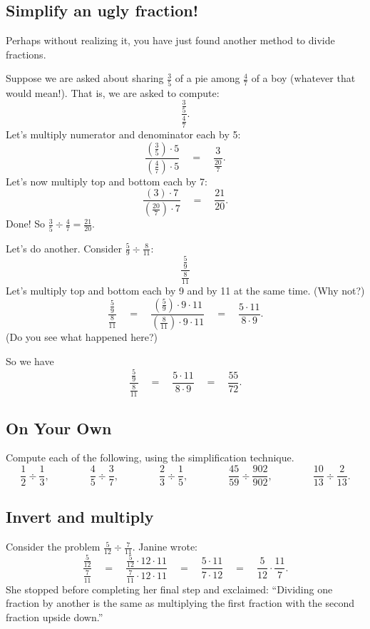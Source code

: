 \subsection{Simplify an ugly fraction!}
Perhaps without realizing it, you have just found another method to divide fractions.

\begin{example}
Suppose we are  asked about sharing $\frac 3 5$
of a pie among $\frac 4 7$
of a boy (whatever that would mean!). That is,
we are  asked to compute:
\[
\frac{\frac 3 5}{\frac 4 7}.
\]
Let's multiply numerator and denominator each by 5:
\[
\frac{\left(\frac 3 5\right)\cdot5}{\left(\frac 4 7\right)\cdot 5}
\quad
=
\quad
\frac{3}{\frac{20}7}.
\]
Let's now multiply top and bottom each by 7:
\[
\frac{\left(3\right)\cdot 7}{\left(\frac{20}7\right)\cdot 7}
\quad
= 
\quad
\frac{21}{20}.
\]
Done!  So $\frac 3 5 \div \frac 4 7 = \frac {21}{20}$.
\end{example}


\begin{example}
Let's do another. Consider $\frac 5 9 \div \frac 8{11}$:
\[
\frac{\frac 59}{\frac 8{11}}
\]
Let's multiply top and bottom each by 9 and by 11 at the same time. (Why not?)
\[
\frac{\frac 59}{\frac 8{11}}
\quad
 =
 \quad
\frac{\left(\frac 59\right)\cdot9\cdot 11}{\left(\frac 8{11}\right) \cdot 9\cdot 11}
\quad
= 
\quad
\frac{5\cdot 11}{8\cdot 9}.
\]
(Do you see what happened here?)

So we have 
\[
\frac{\frac 59}{\frac 8{11}}
\quad
=
\quad
\frac{5\cdot 11}{8\cdot9}
\quad
 = 
 \quad
 \frac {55}{72}.
\]
\end{example}



\subsection*{On Your Own}
Compute each of the following, using the simplification technique.
\[
\frac 12 \div \frac 1 3,
\qquad\qquad
\frac 4 5 \div \frac 3 7,
\qquad\qquad
\frac 2 3 \div \frac 1 5,
\qquad\qquad
\frac {45}{59} \div \frac {902}{902},
\qquad\qquad
\frac{10}{13} \div \frac{2}{13}.
\]



\subsection{Invert and multiply}
Consider the problem
$\frac 5 {12} \div \frac 7 {11}$.
Janine wrote:
\[
\frac{\frac 5 {12} }{ \frac 7 {11}} 
\quad
= 
\quad
\frac{\frac 5 {12} \cdot 12\cdot 11}{ \frac 7 {11} \cdot 12 \cdot 11} 
\quad
= 
\quad
\frac{ 5 \cdot 11 }{  7\cdot 12} 
\quad
=
\quad
\frac 5{12} \cdot \frac{11} 7.
\]
She stopped before completing her final step and  exclaimed: 
``Dividing one fraction by another is the same as multiplying
the first fraction with the second fraction upside down.''


